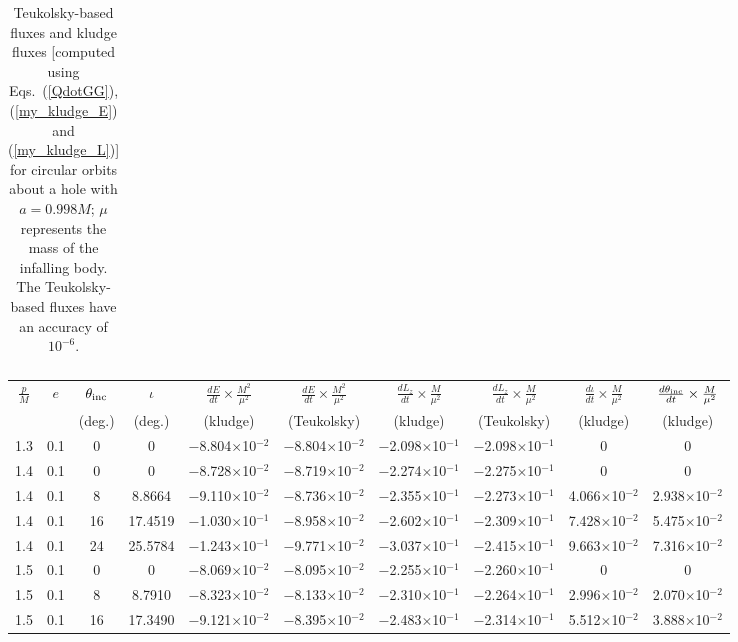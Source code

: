 \documentclass[aps,prd,twocolumn,showpacs,groupedaddress,nofootinbib]{revtex4}
\newcommand\T{\rule{0pt}{3ex}}
\newcommand\B{\rule[-2ex]{0pt}{0pt}}
\begin{document}
\begin{widetext}
\begin{table}[h]
\begin{tabular}{|c|c|c|c|c|c|c|c|c|c|c|c|}
 \hline
\end{tabular}
\caption{Teukolsky-based fluxes and kludge fluxes [computed using
Eqs.\ (\ref{QdotGG}), (\ref{my_kludge_E}) and (\ref{my_kludge_L})] for
circular orbits about a hole with $a=0.998 M$; $\mu$ represents the mass of the infalling body.
The Teukolsky-based fluxes have an accuracy of $10^{-6}$.
\label{teuk_circ}} 
\end{table}

\begin{table}[h]
\begin{tabular}{|c|c|c|c|c|c|c|c|c|c|}
\hline
 \T\B$\frac{p}{M}$ & $e$ & $\theta_{\rm inc}$& $\iota$& $\frac{dE}{dt}\times\frac{M^2}{\mu^2}$ & $\frac{dE}{dt}\times\frac{M^2}{\mu^2}$ & $\frac{dL_z}{dt}\times\frac{M}{\mu^2}$ & $\frac{dL_z}{dt}\times\frac{M}{\mu^2}$ & $\frac{d\iota}{dt}\times\frac{M}{\mu^2}$& $\frac{d\theta_{\rm inc}}{dt}\times\frac{M}{\mu^2}$\\
&&(deg.)&(deg.)& (kludge) & (Teukolsky) & (kludge) & (Teukolsky)& (kludge) &  (kludge) \\
\hline
\T 1.3&  0.1&  0&  0& $-$8.804$\times$10$^{-2}$& $-$8.804$\times$10$^{-2}$& $-$2.098$\times$10$^{-1}$& $-$2.098$\times$10$^{-1}$&  0&  0\\
  1.4&  0.1&  0&  0& $-$8.728$\times$10$^{-2}$& $-$8.719$\times$10$^{-2}$& $-$2.274$\times$10$^{-1}$& $-$2.275$\times$10$^{-1}$&  0&   0\\
  1.4&  0.1&  8&  8.8664& $-$9.110$\times$10$^{-2}$& $-$8.736$\times$10$^{-2}$& $-$2.355$\times$10$^{-1}$& $-$2.273$\times$10$^{-1}$&  4.066$\times$10$^{-2}$&  2.938$\times$10$^{-2}$\\
  1.4&  0.1& 16& 17.4519& $-$1.030$\times$10$^{-1}$& $-$8.958$\times$10$^{-2}$& $-$2.602$\times$10$^{-1}$& $-$2.309$\times$10$^{-1}$&  7.428$\times$10$^{-2}$&   5.475$\times$10$^{-2}$\\
  1.4&  0.1& 24& 25.5784& $-$1.243$\times$10$^{-1}$& $-$9.771$\times$10$^{-2}$& $-$3.037$\times$10$^{-1}$& $-$2.415$\times$10$^{-1}$&  9.663$\times$10$^{-2}$&  7.316$\times$10$^{-2}$\\
  1.5&  0.1&  0&  0& $-$8.069$\times$10$^{-2}$& $-$8.095$\times$10$^{-2}$& $-$2.255$\times$10$^{-1}$& $-$2.260$\times$10$^{-1}$&  0&   0\\
  1.5&  0.1&  8&  8.7910& $-$8.323$\times$10$^{-2}$& $-$8.133$\times$10$^{-2}$& $-$2.310$\times$10$^{-1}$& $-$2.264$\times$10$^{-1}$&  2.996$\times$10$^{-2}$&   2.070$\times$10$^{-2}$\\
  1.5&  0.1& 16& 17.3490& $-$9.121$\times$10$^{-2}$& $-$8.395$\times$10$^{-2}$& $-$2.483$\times$10$^{-1}$& $-$2.314$\times$10$^{-1}$&  5.512$\times$10$^{-2}$&   3.888$\times$10$^{-2}$\\

\end{tabular}
\end{table}
\end{widetext}
\end{document}
